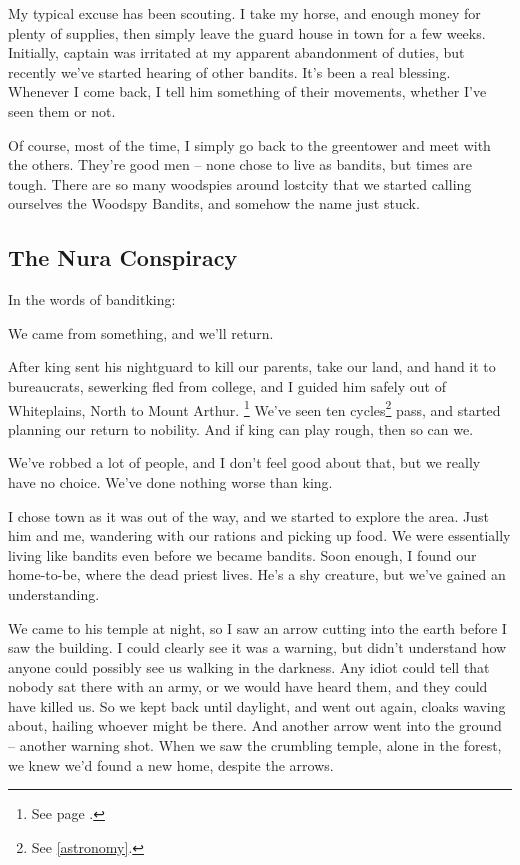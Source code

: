 \begin{multicols}{2}
\begin{exampletext}

  My typical excuse has been scouting.
  I take my horse, and enough money for plenty of supplies, then simply leave the guard house in \gls{town} for a few weeks.
  Initially, \gls{captain} was irritated at my apparent abandonment of duties, but recently we've started hearing of other bandits.
  It's been a real blessing.
  Whenever I come back, I tell him something of their movements, whether I've seen them or not.

  Of course, most of the time, I simply go back to the \gls{greentower} and meet with the others.
  They're good men -- none chose to live as bandits, but times are tough.
  There are so many woodspies around \gls{lostcity} that we started calling ourselves the Woodspy Bandits, and somehow the name just stuck.

\end{exampletext}

\subsection{The Nura Conspiracy}

In the words of \gls{banditking}:

\begin{exampletext}

  We came from something, and we'll return.

  After \gls{king} sent his \gls{nightguard} to kill our parents, take our land, and hand it to bureaucrats, \gls{sewerking} fled from \gls{college}, and I guided him safely out of Whiteplains, North to Mount Arthur.
  \footnote{See page \pageref{whiteplainsWar}.}
  We've seen ten cycles\footnote{See \autoref{astronomy}.} pass, and started planning our return to nobility.
  And if \gls{king} can play rough, then so can we.

  We've robbed a lot of people, and I don't feel good about that, but we really have no choice.
  We've done nothing worse than \gls{king}.

  I chose \gls{town} as it was out of the way, and we started to explore the area.
  Just him and me, wandering with our rations and picking up food.
  We were essentially living like bandits even before we became bandits.
  Soon enough, I found our home-to-be, where the dead priest lives.
  He's a shy creature, but we've gained an understanding.

  We came to his temple at night, so I saw an arrow cutting into the earth before I saw the building.
  I could clearly see it was a warning, but didn't understand how anyone could possibly see us walking in the darkness.
  Any idiot could tell that nobody sat there with an army, or we would have heard them, and they could have killed us.
  So we kept back until daylight, and went out again, cloaks waving about, hailing whoever might be there.
  And another arrow went into the ground -- another warning shot.
  When we saw the crumbling temple, alone in the forest, we knew we'd found a new home, despite the arrows.


\end{exampletext}
\end{multicols}
